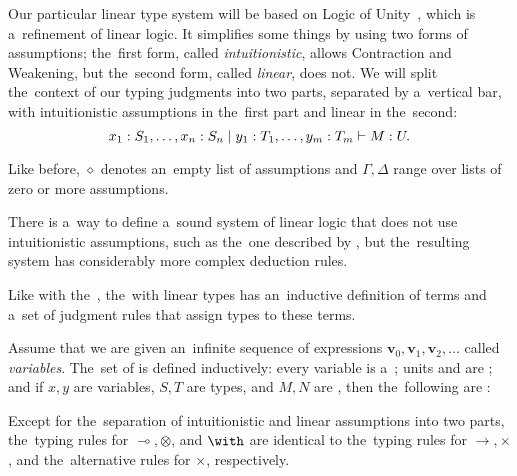 
Our particular linear type system will be based on Logic of
Unity~\citep{girard_1993}, which is a~refinement of linear logic. It simplifies
some things by using two forms of assumptions; the~first form, called
\emph{intuitionistic}, allows Contraction and Weakening, but the~second form,
called \emph{linear}, does not. We will split the~context of our typing
judgments into two parts, separated by a~vertical bar, with intuitionistic
assumptions in the~first part and linear in the~second:
\[
  x_1 \overset{}: S_1, \dotsc, x_n \overset{}: S_n \mid y_1 \overset{}: T_1, \dotsc, y_m \overset{}: T_m
    \vdash M \overset{}: U.
\]

Like before, $\diamond$ denotes an~empty list of assumptions and $\Gamma,
\Delta$ range over lists of zero or more assumptions.

There is a~way to define a~sound system of linear logic that does not use
intuitionistic assumptions, such as the~one described by
\citet{benton_et_al_1993}, but the~resulting system has considerably more
complex deduction rules.

Like with the~, the~\lc with linear types has an~inductive
definition of terms and a~set of judgment rules that assign types to these
terms.

\begin{definition}
  Assume that we are given an~infinite sequence of expressions $\mathbf{v}_0,
  \mathbf{v}_1, \mathbf{v}_2, \dots$ called \emph{variables}. The~set of
  \emph{\lts} is defined inductively: every variable is a~\lt; units \munit
  and \aunit are \lts; and if $x, y$ are variables, $S, T$ are types, and $M, N$
  are \lts, then the~following are \lts:
\end{definition}


Except for the~separation of intuitionistic and linear assumptions into two
parts, the~typing rules for $\multimap, \otimes$, and $\with$ are identical to
the~typing rules for $\to, \times$, and the~alternative rules for $\times$,
respectively.

